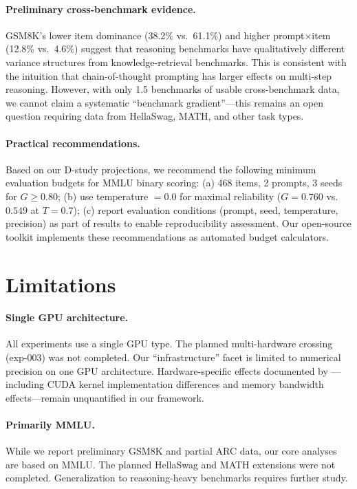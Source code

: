 \documentclass[letterpaper]{article}
\begin{document}
\paragraph{Preliminary cross-benchmark evidence.}
GSM8K's lower item dominance (38.2\% vs.\ 61.1\%) and higher prompt$\times$item (12.8\% vs.\ 4.6\%) suggest that reasoning benchmarks have qualitatively different variance structures from knowledge-retrieval benchmarks. This is consistent with the intuition that chain-of-thought prompting has larger effects on multi-step reasoning. However, with only 1.5 benchmarks of usable cross-benchmark data, we cannot claim a systematic ``benchmark gradient''---this remains an open question requiring data from HellaSwag, MATH, and other task types.

\paragraph{Practical recommendations.}
Based on our D-study projections, we recommend the following minimum evaluation budgets for MMLU binary scoring: (a) 468 items, 2 prompts, 3 seeds for $G \geq 0.80$; (b) use temperature $= 0.0$ for maximal reliability ($G = 0.760$ vs.\ $0.549$ at $T = 0.7$); (c) report evaluation conditions (prompt, seed, temperature, precision) as part of results to enable reproducibility assessment. Our open-source toolkit implements these recommendations as automated budget calculators.

\section{Limitations}

\paragraph{Single GPU architecture.}
All experiments use a single GPU type. The planned multi-hardware crossing (exp-003) was not completed. Our ``infrastructure'' facet is limited to numerical precision on one GPU architecture. Hardware-specific effects documented by \citet{yuan2025llm}---including CUDA kernel implementation differences and memory bandwidth effects---remain unquantified in our framework.

\paragraph{Primarily MMLU.}
While we report preliminary GSM8K and partial ARC data, our core analyses are based on MMLU. The planned HellaSwag and MATH extensions were not completed. Generalization to reasoning-heavy benchmarks requires further study.
\end{document}
